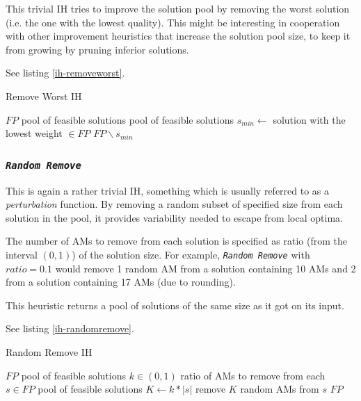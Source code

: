 \documentclass[a4paper,12pt,oneside]{report}
\newcommand{\jmodule}[1]{\texttt{\textit{#1}}}
\theoremstyle{definition}
\begin{document}
This trivial IH tries to improve the solution pool by removing the worst solution (i.e. the one with the lowest quality). This might be interesting in cooperation with other improvement heuristics that increase the solution pool size, to keep it from growing by pruning inferior solutions.

See listing \ref{ih-removeworst}.

\begin{algorithm}
\caption{Remove Worst IH}
\label{ih-removeworst}
\begin{algorithmic}
\REQUIRE $FP$ pool of feasible solutions
\ENSURE pool of feasible solutions
\STATE $s_{min} \gets $ solution with the lowest weight $\in FP$
\RETURN $FP \backslash s_{min}$
\end{algorithmic}
\end{algorithm}

\subsubsection{\jmodule{Random Remove}}

This is again a rather trivial IH, something which is usually referred to as a \textit{perturbation} function. %
By removing a random subset of specified size from each solution in the pool, it provides variability needed to escape from local optima. %

The number of AMs to remove from each solution is specified as ratio (from the interval $(0, 1)$) of the solution size. %
For example, \jmodule{Random Remove} with $ratio = 0.1$ would remove 1 random AM from a solution containing 10 AMs and 2 from a solution containing 17 AMs (due to rounding).

This heuristic returns a pool of solutions of the same size as it got on its input. 

See listing \ref{ih-randomremove}.

\begin{algorithm}
\caption{Random Remove IH}
\label{ih-randomremove}
\begin{algorithmic}
\REQUIRE $FP$ pool of feasible solutions
\REQUIRE $k \in (0,1)$ ratio of AMs to remove from each $s \in FP$
\ENSURE pool of feasible solutions
  \STATE $K \gets k * |s|$
  \STATE remove $K$ random AMs from $s$
\ENDFOR
\RETURN $FP$
\end{algorithmic}
\end{algorithm}
\end{document}
